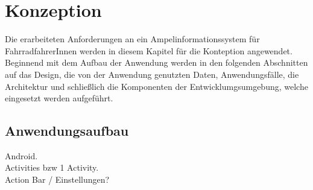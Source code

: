 \chapter{\label{chap:entwurf}Konzeption}
Die erarbeiteten Anforderungen an ein Ampelinformationssystem für FahrradfahrerInnen werden in diesem Kapitel für die Konteption angewendet. Beginnend mit dem Aufbau der Anwendung werden in den folgenden Abschnitten auf das Design, die von der Anwendung genutzten Daten, Anwendungsfälle, die Architektur und schließlich die Komponenten der Entwicklumgsumgebung, welche eingesetzt werden aufgeführt. 
\section{Anwendungsaufbau}
Android. \\ Activities bzw 1 Activity. \\ Action Bar / Einstellungen? \\
